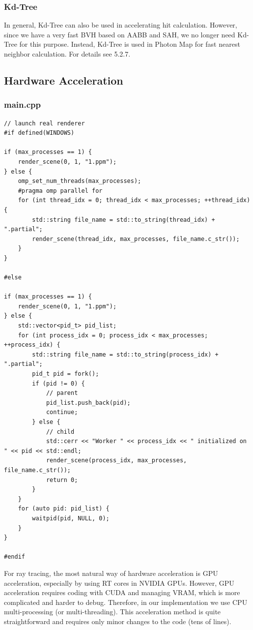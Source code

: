 \documentclass[utf8]{article}
\begin{document}
\subsubsection{Kd-Tree}
In general, Kd-Tree can also be used in accelerating hit calculation. However, since we have a very fast BVH based on AABB and SAH, we no longer need Kd-Tree for this purpose. Instead, Kd-Tree is used in Photon Map for fast nearest neighbor calculation. For details see 5.2.7.

\subsection{Hardware Acceleration}
\subsubsection*{main.cpp}
\begin{lstlisting}[style=CStyle]
    // launch real renderer
#if defined(WINDOWS)

if (max_processes == 1) {
	render_scene(0, 1, "1.ppm");
} else {
	omp_set_num_threads(max_processes);
	#pragma omp parallel for
	for (int thread_idx = 0; thread_idx < max_processes; ++thread_idx) {
		std::string file_name = std::to_string(thread_idx) + ".partial";
		render_scene(thread_idx, max_processes, file_name.c_str());
	}
}

#else

if (max_processes == 1) {
	render_scene(0, 1, "1.ppm");
} else {
	std::vector<pid_t> pid_list;
	for (int process_idx = 0; process_idx < max_processes; ++process_idx) {
		std::string file_name = std::to_string(process_idx) + ".partial";
		pid_t pid = fork();
		if (pid != 0) {
			// parent
			pid_list.push_back(pid);
			continue;
		} else {
			// child
			std::cerr << "Worker " << process_idx << " initialized on " << pid << std::endl;
			render_scene(process_idx, max_processes, file_name.c_str());
			return 0;
		}
	}
	for (auto pid: pid_list) {
		waitpid(pid, NULL, 0);
	}
}

#endif
\end{lstlisting}
For ray tracing, the most natural way of hardware acceleration is GPU acceleration, especially by using RT cores in NVIDIA GPUs. However, GPU acceleration requires coding with CUDA and managing VRAM, which is more complicated and harder to debug. Therefore, in our implementation we use CPU multi-processing (or multi-threading). This acceleration method is quite straightforward and requires only minor changes to the code (tens of lines).
\end{document}
